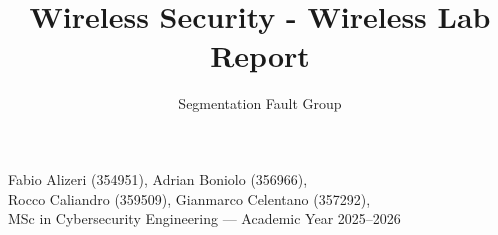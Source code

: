 \documentclass[sigconf, review]{acmart}
\title{Wireless Security - Wireless Lab Report}
\author{Segmentation Fault Group}
\affiliation{
  \institution{Polytechnic of Turin}
  \country{Italy}
}
\begin{document}
\maketitle

\vspace{-1em}
\begin{center}
\small
Fabio Alizeri (354951), Adrian Boniolo (356966),\\
Rocco Caliandro (359509), Gianmarco Celentano (357292), \\
MSc in Cybersecurity Engineering — Academic Year 2025--2026
\end{center}










\appendix

\end{document}
